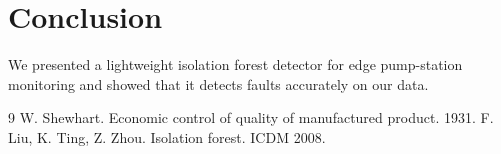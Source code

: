 \documentclass{article}
\begin{document}
\section{Conclusion}
We presented a lightweight isolation forest detector for edge pump-station monitoring and showed that it detects faults accurately on our data.

\begin{thebibliography}{9}
 W. Shewhart. Economic control of quality of manufactured product. 1931.
 F. Liu, K. Ting, Z. Zhou. Isolation forest. ICDM 2008.
\end{thebibliography}
\end{document}
